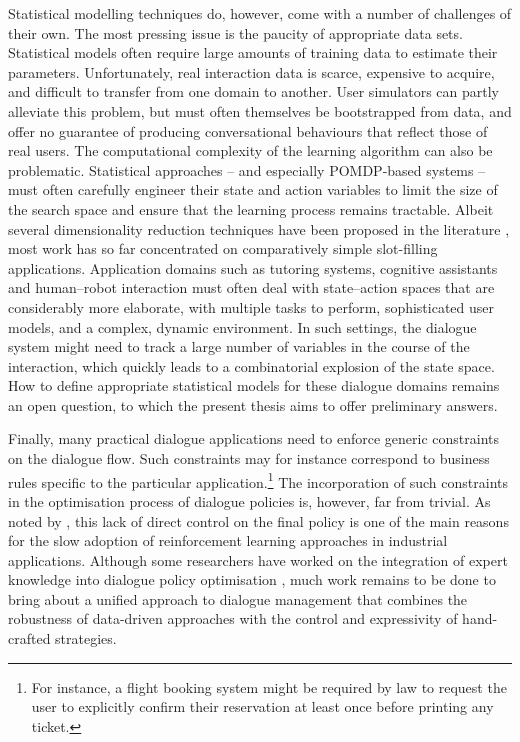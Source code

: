 Statistical modelling techniques do, however, come with a number of challenges of their own. The most pressing issue is the paucity of appropriate data sets.  Statistical models often require large amounts of training data to estimate their parameters. Unfortunately, real interaction data is scarce, expensive to acquire, and difficult to transfer from one domain to another.  User simulators can partly alleviate this problem, but must often themselves be bootstrapped from data, and offer no guarantee of producing conversational behaviours that reflect those of real users.  The computational complexity of the learning algorithm can also be problematic. Statistical approaches -- and especially POMDP-based systems -- must often carefully engineer their state and action variables to limit the size of the search space and ensure that the learning process remains tractable.  Albeit several dimensionality reduction techniques have been proposed in the literature \citep{williams2005,Young:2010,Cuayahuitl:2010,CrookL11}, most work has so far concentrated on comparatively simple slot-filling applications.  Application domains such as tutoring systems, cognitive assistants and human--robot interaction must often deal with state--action spaces that are considerably more elaborate, with multiple tasks to perform, sophisticated user models, and a complex, dynamic environment.  In such settings, the dialogue system might need to track a large number of variables in the course of the interaction, which quickly leads to a combinatorial explosion of the state space.  How to define appropriate statistical models for these dialogue domains remains an open question, to which the present thesis aims to offer preliminary answers. 

Finally, many practical dialogue applications need to enforce generic constraints on the dialogue flow.  Such constraints may for instance correspond to business rules specific to the particular application.\footnote{For instance, a flight booking system might be required by law to request the user to explicitly confirm their reservation at least once before printing any ticket.} The incorporation of such constraints in the optimisation process of dialogue policies is, however, far from trivial. As noted by \cite{Paek:2008}, this lack of direct control on the final policy is one of the main reasons for the slow adoption of reinforcement learning approaches in industrial applications.  Although some researchers have worked on the integration of expert knowledge into dialogue policy optimisation \citep{heeman2007,williams2008}, much work remains to be done to bring about a unified approach to dialogue management that combines the robustness of data-driven approaches with the control and expressivity of hand-crafted strategies. 

